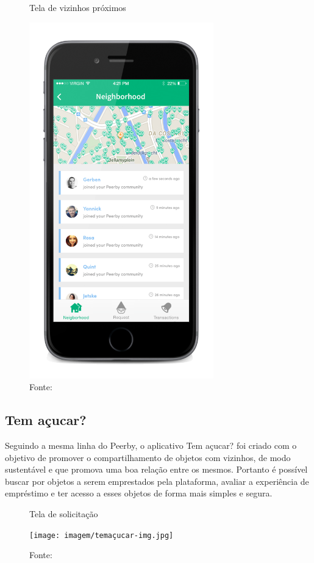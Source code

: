     \begin{figure}[h]
    \caption{Tela de vizinhos próximos}
    \centering %
    \includegraphics[width=8cm]{imagem/peerby-img.png}
    \caption*{Fonte: \cite{PEERBY2014}}
    \label{figura:peerby}
    \end{figure}
    
    \subsection{Tem açucar?}
    
    Seguindo a mesma linha do Peerby, o aplicativo Tem açucar? foi criado com o objetivo de promover o compartilhamento de objetos com vizinhos, de modo sustentável e que promova uma boa relação entre os mesmos. Portanto é possível buscar por objetos a serem emprestados pela plataforma, avaliar a experiência de empréstimo e ter acesso a esses objetos de forma mais simples e segura.
    
    \begin{figure}[h]
    \caption{Tela de solicitação}
    \centering %
    \texttt{[image: imagem/temaçucar-img.jpg]}
    \caption*{Fonte: \cite{NATALIA2020}}
    \label{figura:comparative-board}
    \end{figure}
    
